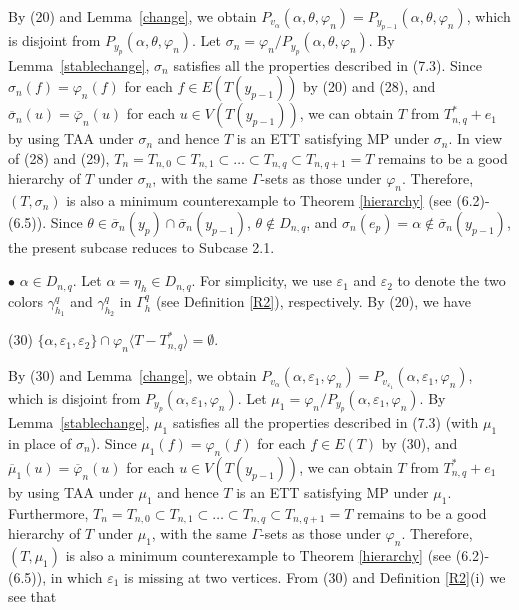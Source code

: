 \documentclass[11pt]{article}
\begin{document}
By (20) and Lemma~\ref{change}, we obtain $P_{v_{\alpha}} (\alpha, \theta, \varphi_n) = P_{y_{p-1}}(\alpha, \theta, \varphi_n)$, 
which is disjoint from $P_{y_p}(\alpha, \theta, \varphi_n)$. Let $\sigma_n=\varphi_n/P_{y_p}(\alpha, \theta, \varphi_n)$. By Lemma~\ref{stablechange},  $\sigma_n$ satisfies all the properties described in (7.3). Since $\sigma_n(f)=\varphi_n(f)$ for 
each $f\in E(T(y_{p-1}))$ by (20) and (28), and $\overline{\sigma}_n(u)=\overline{\varphi}_n(u)$ for each $u\in V(T(y_{p-1}))$, 
we can obtain $T$ from $T_{n,q}^*+e_1$ by using TAA under $\sigma_n$ and hence $T$ is an ETT satisfying MP under $\sigma_n$. In view of (28) and (29), $T_n=T_{n,0} \subset T_{n,1} \subset \ldots \subset T_{n,q} \subset T_{n,q+1}=T$ remains to be a good hierarchy of $T$ under $\sigma_n$, with the same $\Gamma$-sets as those under $\varphi_n$. Therefore, $(T, \sigma_n)$ is also a minimum counterexample 
to Theorem \ref{hierarchy} (see (6.2)-(6.5)). Since $\theta \in \overline{\sigma}_n(y_p) \cap \overline{\sigma}_n(y_{p-1})$, 
$\theta \notin D_{n,q}$, and $\sigma_n(e_p)=\alpha \notin \overline{\sigma}_n(y_{p-1})$, the present subcase reduces to Subcase 2.1.

$\bullet$ $\alpha\in D_{n,q}$. Let $\alpha=\eta_{h}\in D_{n,q}$. For simplicity, we use $\varepsilon_1$ and $\varepsilon_2$
to denote the two colors $\gamma^{q}_{h_1}$ and $\gamma^{q}_{h_2}$ in $\Gamma^{q}_h$ (see Definition \ref{R2}), respectively. 
By (20), we have

(30) $\{\alpha, \varepsilon_1, \varepsilon_2\}\cap \varphi_n \langle T - T_{n,q}^* \rangle=\emptyset$.

By (30) and Lemma~\ref{change}, we obtain $P_{v_{\alpha}} (\alpha, \varepsilon_1, \varphi_n) = P_{v_{\varepsilon_1}}
(\alpha, \varepsilon_1, \varphi_n)$, which is disjoint from $P_{y_p}(\alpha, \varepsilon_1, \varphi_n)$. 
Let $\mu_1=\varphi_n/P_{y_p}(\alpha, \varepsilon_1, \varphi_n)$. By Lemma~\ref{stablechange},  $\mu_1$ satisfies 
all the properties described in (7.3) (with $\mu_1$ in place of $\sigma_n$). Since $\mu_1(f)=\varphi_n(f)$ for each $f\in E(T)$
by (30), and $\overline{\mu}_1(u)=\overline{\varphi}_n(u)$ for each $u\in V(T(y_{p-1}))$, we can obtain $T$ from $T_{n,q}^*+e_1$ by 
using TAA under $\mu_1$ and hence $T$ is an ETT satisfying MP under $\mu_1$. Furthermore, $T_n=T_{n,0} \subset T_{n,1} \subset \ldots \subset T_{n,q} \subset T_{n,q+1}=T$ remains to be a good hierarchy of $T$ under $\mu_1$, with the same $\Gamma$-sets as those under $\varphi_n$. Therefore, $(T, \mu_1)$ is also a minimum counterexample to Theorem \ref{hierarchy} (see (6.2)-(6.5)),
in which $\varepsilon_1$ is missing at two vertices. From (30) and Definition \ref{R2}(i) we see that 
\end{document}
